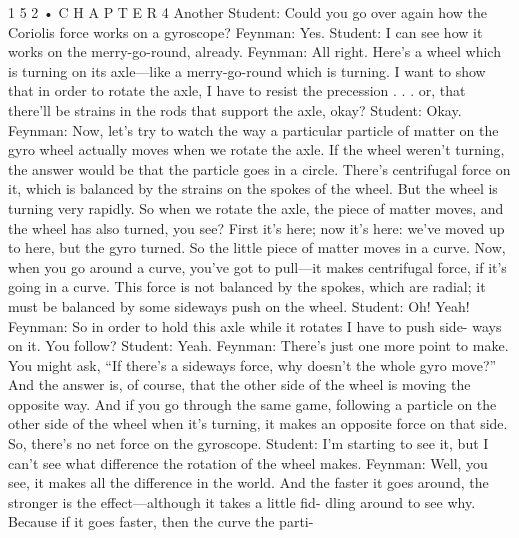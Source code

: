 \documentclass[10pt,oneside]{article}
\begin{document}
1 5 2 • C H A P T E R  4 Another Student: Could you go over again how the Coriolis force works on a gyroscope? Feynman: Yes. Student: I can see how it works on the merry-go-round, already. Feynman: All right. Here’s a wheel which is turning on its axle---like a merry-go-round which is turning. I want to show that in order to rotate the axle, I have to resist the precession . . . or, that there’ll be strains in the rods that support the axle, okay? Student: Okay. Feynman: Now, let’s try to watch the way a particular particle of matter on the gyro wheel actually moves when we rotate the axle. If the wheel weren’t turning, the answer would be that the particle goes in a circle. There’s centrifugal force on it, which is balanced by the strains on the spokes of the wheel. But the wheel is turning very rapidly. So when we rotate the axle, the piece of matter moves, and the wheel has also turned, you see? First it’s here; now it’s here: we’ve moved up to here, but the gyro turned. So the little piece of matter moves in a curve. Now, when you go around a curve, you’ve got to pull---it makes centrifugal force, if it’s going in a curve. This force is not balanced by the spokes, which are radial; it must be balanced by some sideways push on the wheel. Student: Oh! Yeah! Feynman: So in order to hold this axle while it rotates I have to push side- ways on it. You follow? Student: Yeah. Feynman: There’s just one more point to make. You might ask, “If there’s a sideways force, why doesn’t the whole gyro move?” And the answer is, of course, that the other side of the wheel is moving the opposite way. And if you go through the same game, following a particle on the other side of the wheel when it’s turning, it makes an opposite force on that side. So, there’s no net force on the gyroscope. Student: I’m starting to see it, but I can’t see what difference the rotation of the wheel makes. Feynman: Well, you see, it makes all the difference in the world. And the faster it goes around, the stronger is the effect---although it takes a little fid- dling around to see why. Because if it goes faster, then the curve the parti-\par
\end{document}
